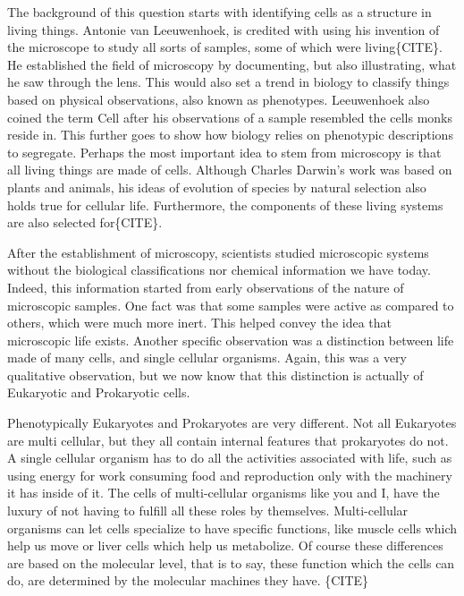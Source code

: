 \documentclass[draft, english]{volcanica-template}
\begin{document}
The background of this question starts with identifying cells as a structure in living things. Antonie van Leeuwenhoek, is credited with using his invention of the microscope to study all sorts of samples, some of which were living\{CITE\}. He established the field of microscopy by documenting, but also illustrating, what he saw through the lens. This would also set a trend in biology to classify things based on physical observations, also known as phenotypes. Leeuwenhoek also coined the term Cell after his observations of a sample resembled the cells monks reside in. This further goes to show how biology relies on phenotypic descriptions to segregate. Perhaps the most important idea to stem from microscopy is that all living things are made of cells. Although Charles Darwin's work was based on plants and animals, his ideas of evolution of species by natural selection also holds true for cellular life. Furthermore, the components of these living systems are also selected for\{CITE\}.

After the establishment of microscopy, scientists studied microscopic systems without the biological classifications nor chemical information we have today. Indeed, this information started from early observations of the nature of microscopic samples. One fact was that some samples were active as compared to others, which were much more inert. This helped convey the idea that microscopic life exists. Another specific observation was a distinction between life made of many cells, and single cellular organisms. Again, this was a very qualitative observation, but we now know that this distinction is actually of Eukaryotic and Prokaryotic cells.

Phenotypically Eukaryotes and Prokaryotes are very different. Not all Eukaryotes are multi cellular, but they all contain internal features that prokaryotes do not. A single cellular organism has to do all the activities associated with life, such as using energy for work consuming food and reproduction only with the machinery it has inside of it. The cells of multi-cellular organisms like you and I, have the luxury of not having to fulfill all these roles by themselves. Multi-cellular organisms can let cells specialize to have specific functions, like muscle cells which help us move or liver cells which help us metabolize. Of course these differences are based on the molecular level, that is to say, these function which the cells can do, are determined by the molecular machines they have. \{CITE\}
\end{document}

